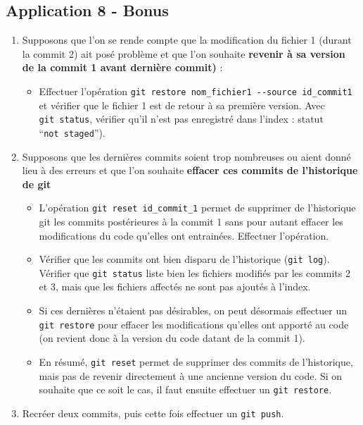 \documentclass[
  letterpaper,
  DIV=11,
  numbers=noendperiod]{scrartcl}
\providecommand{\tightlist}{%
  \setlength{\itemsep}{0pt}\setlength{\parskip}{0pt}}\usepackage{longtable,booktabs,array}
\begin{document}
\hypertarget{application-8---bonus}{%
\subsection{Application 8 - Bonus}\label{application-8---bonus}}

\begin{tcolorbox}[enhanced jigsaw, colframe=quarto-callout-tip-color-frame, rightrule=.15mm, breakable, colbacktitle=quarto-callout-tip-color!10!white, coltitle=black, toptitle=1mm, title={Revenir à des anciennes versions du code avec l'invite de commandes}, titlerule=0mm, leftrule=.75mm, colback=white, bottomrule=.15mm, bottomtitle=1mm, toprule=.15mm, opacitybacktitle=0.6, arc=.35mm, left=2mm, opacityback=0]

\begin{enumerate}
\def\labelenumi{\arabic{enumi}.}
\tightlist
\item
  Supposons que l'on se rende compte que la modification du fichier 1
  (durant la commit 2) ait posé problème et que l'on souhaite
  \textbf{revenir à sa version de la commit 1 avant dernière commit)} :

  \begin{itemize}
  \tightlist
  \item
    Effectuer l'opération
    \texttt{git\ restore\ nom\_fichier1\ -\/-source\ id\_commit1} et
    vérifier que le fichier 1 est de retour à sa première version. Avec
    \texttt{git\ status}, vérifier qu'il n'est pas enregistré dans
    l'index : statut ``\texttt{not\ staged}'').
  \end{itemize}
\item
  Supposons que les dernières commits soient trop nombreuses ou aient
  donné lieu à des erreurs et que l'on souhaite \textbf{effacer ces
  commits de l'historique de git}

  \begin{itemize}
  \item
    L'opération \texttt{git\ reset\ id\_commit\_1} permet de supprimer
    de l'historique git les commits postérieures à la commit 1 sans pour
    autant effacer les modifications du code qu'elles ont entrainées.
    Effectuer l'opération.
  \item
    Vérifier que les commits ont bien disparu de l'historique
    (\texttt{git\ log}). Vérifier que \texttt{git\ status} liste bien
    les fichiers modifiés par les commits 2 et 3, mais que les fichiers
    affectés ne sont pas ajoutés à l'index.
  \item
    Si ces dernières n'étaient pas désirables, on peut désormais
    effectuer un \texttt{git\ restore} pour effacer les modifications
    qu'elles ont apporté au code (on revient donc à la version du code
    datant de la commit 1).
  \item
    En résumé, \texttt{git\ reset} permet de supprimer des commits de
    l'historique, mais pas de revenir directement à une ancienne version
    du code. Si on souhaite que ce soit le cas, il faut ensuite
    effectuer un \texttt{git\ restore}.
  \end{itemize}
\item
  Recréer deux commits, puis cette fois effectuer un \texttt{git\ push}.


\end{enumerate}
\end{tcolorbox}
\end{document}
